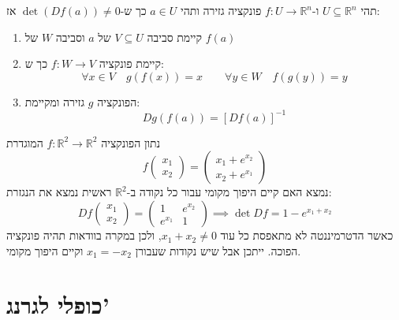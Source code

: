 \documentclass{tstextbook}
\begin{document}
\begin{theorem}
תהי \(U\subseteq \mathbb{R}^n\) ו-\(f:U\to\mathbb{R}^n\) פונקציה גזירה ותהי \(a\in U\) כך ש-\(\det(Df(a))\neq 0\) אז:

  \begin{enumerate}
    \item קיימת סביבה \(V\subseteq U\) של \(a\) וסביבה \(W\) של \(f(a)\)


    \item קיימת פונקציה \(f:W\to V\) כך ש: 
$$\forall x \in V\quad g(f(x))=x\qquad \forall y\in W\quad f(g(y))=y$$


    \item הפונקציה \(g\) גזירה ומקיימת: 
$$Dg(f(a))=[Df(a)]^{-1}$$


  \end{enumerate}
\end{theorem}
\begin{example}
נתון הפונקציה \(f:\mathbb{R}^2\to\mathbb{R}^2\) המוגדרת 
$$f\begin{pmatrix}x_{1}\\x_{2}\end{pmatrix}=\begin{pmatrix}x_{1}+e^{x_{2}} \\x_{2}+e^{x_{1}}
\end{pmatrix}$$
נמצא האם קיים היפוך מקומי עבור כל נקודה ב-\(\mathbb{R}^2\)
ראשית נמצא את הנגזרת:
$$Df\begin{pmatrix}x_{1}\\ x_{2}\end{pmatrix}=\begin{pmatrix}1 & e^{x_{2}} \\e^{x_{1}} & 1
\end{pmatrix}\implies \det Df=1-e^{x_{1}+x_{2}}$$
כאשר הדטרמיננטה לא מתאפסת כל עוד \(x_{1}+x_{2}\neq 0\), ולכן במקרה בוודאות תהיה פונקציה הפוכה. ייתכן אבל שיש נקודות שעבורן \(x_{1}=-x_{2}\) וקיים היפוך מקומי.

\end{example}
\section{כופלי לגרנג'}
\end{document}

